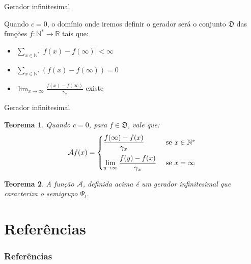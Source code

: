 \documentclass[xcolor=pdftex,dvipsnames]{beamer}
\newcommand{\AAA}{{\mathcal{A}}}
\newcommand{\DDD}{{\mathfrak{D}}}
\newcommand{\Nz}{{\mathbb{N^*}}}
\newcommand{\R}{{\mathbb{R}}}
\newtheorem{teorema}{Teorema}
\begin{document}
\begin{frame}{Gerador infinitesimal}

  Quando $c = 0$, o domínio onde iremos definir o gerador será 
  o conjunto $\DDD$ das funções $f: \Nz \to \R$ tais que:

  \begin{itemize}
  \item $\displaystyle \sum_{x\in \Nz} |f(x)-f(\infty)| < \infty$
  \item $\displaystyle \sum_{x\in \Nz} \left( f(x)-f(\infty)\right) = 0$
  \item $\displaystyle \lim_{x \to \infty} \frac{f(x) -
      f(\infty)}{\gamma_x}$ existe
  \end{itemize}  
\end{frame}

\begin{frame}{Gerador infinitesimal}

  \begin{teorema}
    Quando $c = 0$, para $f \in \DDD$, vale que:
    \begin{displaymath}
      \AAA f (x) = \begin{cases}
        \displaystyle
        \frac{f(\infty) - f(x)}{\gamma_x} & \text{ se } x \in \Nz \vspace{2mm}\\
        \displaystyle
        \lim_{y \to \infty} \frac{f(y) - f(x)}{\gamma_x} & \text{ se } x=\infty\\
      \end{cases}
    \end{displaymath}
  \end{teorema}
  \pause
  \begin{teorema}
    A função $\AAA$, definida acima é um gerador infinitesimal que
    caracteriza o semigrupo $\Psi_t$.
  \end{teorema}
\end{frame}



\section{Referências}
\begin{frame}
  \frametitle{Referências}
   
   
\end{frame}
\end{document}

